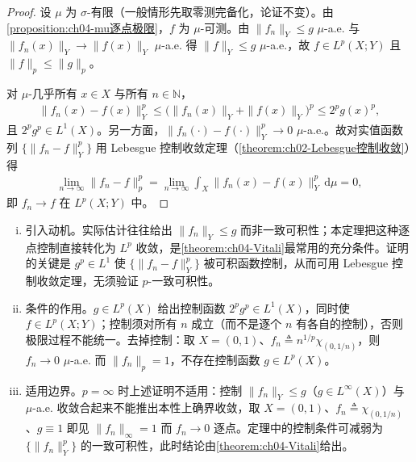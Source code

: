 \documentclass[../../main.tex]{subfiles}%
\begin{document}
\begin{proof}
设 $\mu$ 为 $\sigma$-有限（一般情形先取零测完备化，论证不变）。由\cref{proposition:ch04-mu逐点极限}，$f$ 为 $\mu$-可测。由 $\|f_n\|_Y\leqslant g$ $\mu$-a.e. 与 $\|f_n(x)\|_Y\to\|f(x)\|_Y$ $\mu$-a.e. 得 $\|f\|_Y\leqslant g$ $\mu$-a.e.，故 $f\in L^p(X;Y)$ 且 $\|f\|_p\leqslant\|g\|_p$。

对 $\mu$-几乎所有 $x\in X$ 与所有 $n\in\mathbb{N}$，
\begin{align*}
\|f_n(x)-f(x)\|_Y^p\leqslant\big(\|f_n(x)\|_Y+\|f(x)\|_Y\big)^p\leqslant2^p g(x)^p,
\end{align*}
且 $2^pg^p\in L^1(X)$。另一方面，$\|f_n(\cdot)-f(\cdot)\|_Y^p\to0$ $\mu$-a.e.。故对实值函数列 $\{\|f_n-f\|_Y^p\}$ 用 Lebesgue 控制收敛定理（\cref{theorem:ch02-Lebesgue控制收敛}）得
\begin{align*}
\lim_{n\to\infty}\|f_n-f\|_p^p=\lim_{n\to\infty}\int_X\|f_n(x)-f(x)\|_Y^p\,\mathrm{d}\mu=0,
\end{align*}
即 $f_n\to f$ 在 $L^p(X;Y)$ 中。
\end{proof}

\begin{remark}
\begin{enumerate}[(i)]
\item 引入动机。实际估计往往给出 $\|f_n\|_Y\leqslant g$ 而非一致可积性；本定理把这种逐点控制直接转化为 $L^p$ 收敛，是\cref{theorem:ch04-Vitali}最常用的充分条件。证明的关键是 $g^p\in L^1$ 使 $\{\|f_n-f\|_Y^p\}$ 被可积函数控制，从而可用 Lebesgue 控制收敛定理，无须验证 $p$-一致可积性。

\item 条件的作用。$g\in L^p(X)$ 给出控制函数 $2^pg^p\in L^1(X)$，同时使 $f\in L^p(X;Y)$；控制须对所有 $n$ 成立（而不是逐个 $n$ 有各自的控制），否则极限过程不能统一。去掉控制：取 $X=(0,1)$、$f_n\triangleq n^{1/p}\chi_{(0,1/n)}$，则 $f_n\to0$ $\mu$-a.e. 而 $\|f_n\|_p=1$，不存在控制函数 $g\in L^p(X)$。

\item 适用边界。$p=\infty$ 时上述证明不适用：控制 $\|f_n\|_Y\leqslant g$（$g\in L^\infty(X)$）与 $\mu$-a.e. 收敛合起来不能推出本性上确界收敛，取 $X=(0,1)$、$f_n\triangleq\chi_{(0,1/n)}$、$g\equiv1$ 即见 $\|f_n\|_\infty=1$ 而 $f_n\to0$ 逐点。定理中的控制条件可减弱为 $\{\|f_n\|_Y^p\}$ 的一致可积性，此时结论由\cref{theorem:ch04-Vitali}给出。
\end{enumerate}
\end{remark}
\end{document}
